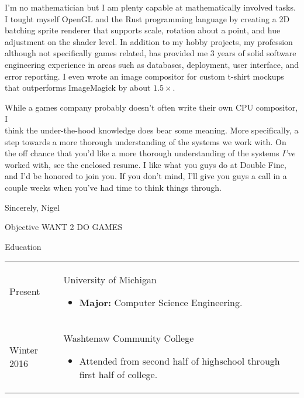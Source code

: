\documentclass[12pt]{article}
\renewcommand{\section}[1]{{\Huge{#1}}\vspace{2 mm}}
\newenvironment{timeline}
        {\begin{tabular}{p{21 mm}|p{150 mm}}}
        {\end{tabular}}
\newenvironment{timelinetitle}
        {\vspace{-2 mm}\begin{large}}
        {\end{large}\vspace{-1.5 mm}}
\newcommand{\timespan}[2]{{#2}\newline{#1}}
\begin{document}
I'm no mathematician but I am plenty capable at mathematically involved
tasks. I tought myself OpenGL and the Rust programming language by creating
a 2D batching sprite renderer that supports scale, rotation about a point, and
hue adjustment on the shader level. In addition to my hobby projects, my profession
although not specifically games related, has provided me 3 years of solid
software engineering experience in areas such as databases, deployment, user
interface, and error reporting. I even wrote an image compositor for custom t-shirt
mockups that outperforms ImageMagick by about $1.5\times$.
\newline

While a games company probably doesn't often write their own CPU compositor,
I \\ think the under-the-hood knowledge does bear some meaning. More specifically,
a step towards a more thorough understanding of the systems we work with.
On the off chance that you'd like a more thorough understanding of the systems
\textit{I've} worked with, see the enclosed resume. I like what you guys do at
Double Fine, and I'd be honored to join you. If you don't mind, I'll give you guys
a call in a couple weeks when you've had time to think things through.
\newline

Sincerely,
\newline
Nigel


\pagebreak

\section{Objective}
\hline
WANT 2 DO GAMES
\newline

\section{Education}
\hline

\begin{timeline}
\timespan{Fall 2016}{Present}
&
\begin{timelinetitle}
    University of Michigan
\end{timelinetitle}
\begin{itemize}
  \item \textbf{Major:} Computer Science Engineering.
\end{itemize}

\\

\timespan{Fall 2012}{Winter 2016}
&
\begin{timelinetitle}
    Washtenaw Community College
\end{timelinetitle}
\begin{itemize}
  \item Attended from second half of highschool through first half of college.
\end{itemize}

\end{timeline}
\end{document}
